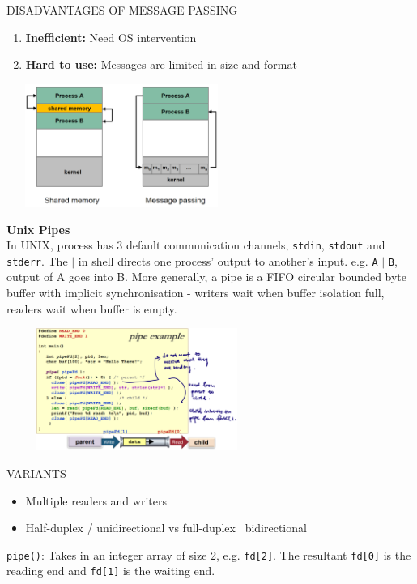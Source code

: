 \documentclass[10pt,landscape]{article}
\begin{document}
\begin{multicols*}{3}
DISADVANTAGES OF MESSAGE PASSING
\begin{enumerate}[topsep=0pt,noitemsep,wide=0pt, leftmargin=\dimexpr\labelwidth + 2\labelsep\relax, topsep=0pt]
    \item \textbf{Inefficient:} Need OS intervention
    \item \textbf{Hard to use:} Messages are limited in size and format
\end{enumerate}
\includegraphics*[width=7.5cm, height=4cm]{images/sharedmemmessagepass.png}

\textbf{Unix Pipes} \\ 
In UNIX, process has 3 default communication channels, \verb|stdin|, \verb|stdout| and \verb|stderr|. The $\vert$
in shell directs one process' output to another's input. e.g. \verb|A| $\vert$  \verb|B|, output of A goes into B.
More generally, a pipe is a FIFO circular bounded byte buffer with implicit synchronisation - writers wait when buffer isolation
full, readers wait when buffer is empty.

\includegraphics*[width=8.5cm, height=4cm]{images/pipe.png}


VARIANTS
\begin{itemize}[topsep=0pt,noitemsep,wide=0pt, leftmargin=\dimexpr{} + 2\relax, topsep=0pt]
    \item Multiple readers and writers
    \item Half-duplex / unidirectional vs full-duplex \ bidirectional
\end{itemize}

\verb|pipe()|: Takes in an integer array of size 2, e.g. \verb|fd[2]|. The resultant \verb|fd[0]| is the reading
end and \verb|fd[1]| is the waiting end.


\end{multicols*}
\end{document}
